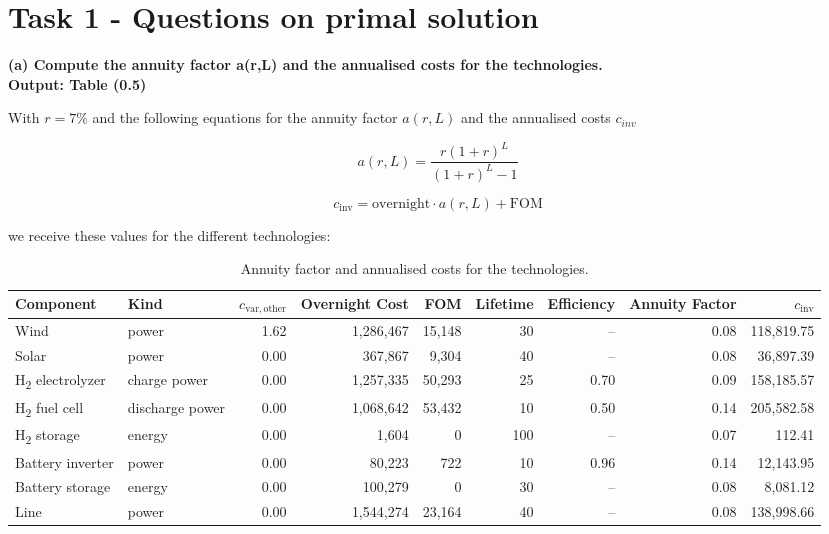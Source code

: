 \section{Task 1 - Questions on primal solution}

\textbf{
    (a) Compute the annuity factor a(r,L) and the annualised costs for the technologies. \\
    Output: Table (0.5)
    }

With $r=7\%$ and the following equations for the annuity factor $a(r,L)$ and the annualised costs $c_{inv}$ 

\begin{equation*}
    a(r,L) = \frac{r(1+r)^L}{(1+r)^L - 1}
\end{equation*}

\begin{equation*}
    c_{\mathrm{inv}}
    = \mathrm{overnight} \cdot a(r,L)
    + \mathrm{FOM}
\end{equation*}

we receive these values for the different technologies:

\begin{table}[ht]
    \centering
    \small
    \setlength{\tabcolsep}{4pt}
    \begin{tabularx}{\textwidth}{l l r r r r r r r}
        \toprule
        Component   & Kind  & $c_{\mathrm{var,other}}$     & Overnight Cost   & FOM    & Lifetime      & Efficiency  & Annuity Factor & $c_{\mathrm{inv}}$ \\
        \midrule
        Wind                            & power            & 1.62 & 1,286,467 & 15,148 & 30     & --   & 0.08 & 118,819.75  \\
        Solar                           & power            & 0.00 & 367,867   & 9,304  & 40     & --   & 0.08 & 36,897.39   \\
        H\textsubscript{2} electrolyzer & charge power     & 0.00 & 1,257,335 & 50,293 & 25     & 0.70 & 0.09 & 158,185.57  \\
        H\textsubscript{2} fuel cell    & discharge power  & 0.00 & 1,068,642 & 53,432 & 10     & 0.50 & 0.14 & 205,582.58  \\
        H\textsubscript{2} storage      & energy           & 0.00 & 1,604     & 0      & 100    & --   & 0.07 & 112.41      \\
        Battery inverter                & power            & 0.00 & 80,223    & 722    & 10     & 0.96 & 0.14 & 12,143.95   \\
        Battery storage                 & energy           & 0.00 & 100,279   & 0      & 30     & --   & 0.08 & 8,081.12    \\
        Line                            & power            & 0.00 & 1,544,274 & 23,164 & 40     & --   & 0.08 & 138,998.66  \\
        \bottomrule
    \end{tabularx}
    \caption{Annuity factor and annualised costs for the technologies.}
    \label{tab:tech_parameters}
\end{table}

